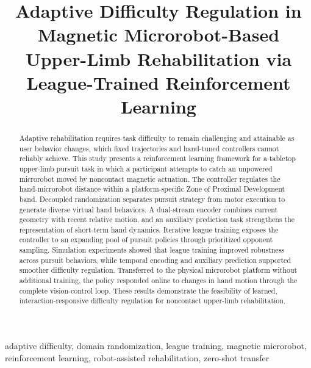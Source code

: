 \documentclass[lettersize,journal]{IEEEtran}
\begin{document}
\title{Adaptive Difficulty Regulation in Magnetic Microrobot-Based Upper-Limb Rehabilitation via League-Trained Reinforcement Learning}
\author{}
\maketitle

\begin{abstract}
Adaptive rehabilitation requires task difficulty to remain challenging and attainable as user behavior changes, which fixed trajectories and hand-tuned controllers cannot reliably achieve. This study presents a reinforcement learning framework for a tabletop upper-limb pursuit task in which a participant attempts to catch an unpowered microrobot moved by noncontact magnetic actuation. The controller regulates the hand-microrobot distance within a platform-specific Zone of Proximal Development band. Decoupled randomization separates pursuit strategy from motor execution to generate diverse virtual hand behaviors. A dual-stream encoder combines current geometry with recent relative motion, and an auxiliary prediction task strengthens the representation of short-term hand dynamics. Iterative league training exposes the controller to an expanding pool of pursuit policies through prioritized opponent sampling. Simulation experiments showed that league training improved robustness across pursuit behaviors, while temporal encoding and auxiliary prediction supported smoother difficulty regulation. Transferred to the physical microrobot platform without additional training, the policy responded online to changes in hand motion through the complete vision-control loop. These results demonstrate the feasibility of learned, interaction-responsive difficulty regulation for noncontact upper-limb rehabilitation.
\end{abstract}

\begin{IEEEkeywords}
adaptive difficulty, domain randomization, league training, magnetic microrobot, reinforcement learning, robot-assisted rehabilitation, zero-shot transfer
\end{IEEEkeywords}
\end{document}
